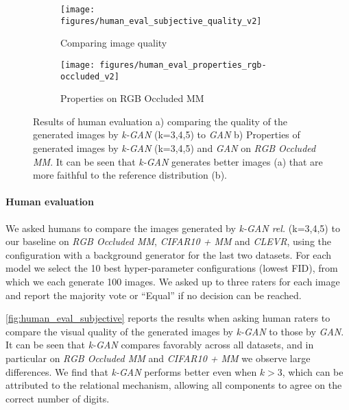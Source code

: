 \documentclass{article}
\begin{document}
\begin{figure}
\begin{subfigure}{.5\textwidth}
  \centering
  \texttt{[image: figures/human\_eval\_subjective\_quality\_v2]}
  \caption{Comparing image quality}
  \label{fig:human_eval_subjective}
\end{subfigure}%
\begin{subfigure}{0.5\textwidth}
  \centering
  \texttt{[image: figures/human\_eval\_properties\_rgb-occluded\_v2]}
  \caption{Properties on RGB Occluded MM}
  \label{fig:human_eval_properties_rgb_occluded}
\end{subfigure}
\caption{Results of human evaluation a) comparing the quality of the generated images by \emph{k-GAN} (k=3,4,5) to \emph{GAN} b) Properties of generated images by \emph{k-GAN} (k=3,4,5) and \emph{GAN} on \emph{RGB Occluded MM}. It can be seen that \emph{k-GAN} generates better images (a) that are more faithful to the reference distribution (b).}
\end{figure}\paragraph{Human evaluation}
We asked humans to compare the images generated by \emph{k-GAN rel.} (k=3,4,5) to our baseline on \emph{RGB Occluded MM}, \emph{CIFAR10 + MM} and \emph{CLEVR}, using the configuration with a background generator for the last two datasets. 
For each model we select the 10 best hyper-parameter configurations (lowest FID), from which we each generate 100 images.
We asked up to three raters for each image and report the majority vote or ``Equal'' if no decision can be reached.

\autoref{fig:human_eval_subjective} reports the results when asking human raters to compare the visual quality of the generated images by \emph{k-GAN} to those by \emph{GAN}.
It can be seen that \emph{k-GAN} compares favorably across all datasets, and in particular on \emph{RGB Occluded MM} and \emph{CIFAR10 + MM} we observe large differences. 
We find that \emph{k-GAN} performs better even when $k>3$, which can be attributed to the relational mechanism, allowing all components to agree on the correct number of digits.

\end{document}
